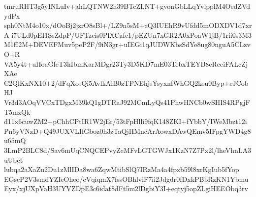 tmruRHT3g5yINLuIv+ahLQTNW2h39BTcZLNT+gvonGbLLqYvlpplM4OedZVdydPx
sph0NtM4o10x/dOoBj2jzrO8sBl+/LZ9n5sM+eQ3IUEhR9vUfdd5mODXDV1d7xrA
i7ULd0pEI1SsZdpP/UFTzcis0PlXCafc1/pEZUn7xGR2A0xPoaW1jB/1rii0s3M3
M1fI2M+DEVEFMuv5peP2F/9iN3gr+uIEGi1qJUDWKbsSdYe8ug80nguA5CLzvO+R
VA5y4t+uHoaGfeT3hIbmKarMDgr23Ty3D5KD7mE03TebxTEYB8cReeiFALcZjXAe
C2QlKxNX10+2/dFqXosQi5AvlkAlB0zTPNEhjsYsyxnfWhGQ2keu0Byp+cJCobHJ
Vr3d3AOqVVCxTDgxM39kQ1gDTRaJ92MCmLyQs41PhwHNCb0wSHIS4RPgjFT5mzQk
d11x6cuwZM2+pChhCPtIR1W2jEr/53tFpHlli9fqK148ZKI+fYbbY/IWeMbzt12i
Pn6yVNzD+Q49JUXVLIfGboz0h3zTaQjHMncArAowxDAwQEmv5IFpgYWD4g8u65mQ
3LmP2BLC8d/Sav6mUqCNQCEPvyZeMFvLGTGWJx1KzN7Z7Px2l/lheVhnLA3uUbet
lubqa2aXaZu2Du1zMlIDa8wa6ZqwMtibSlQ7IRzMa4a4fpxb59l8xrKgIub5fYop
EGscP2V3smdYZIeOheo/cVqiqmX7fssOBhlviF7ii2Jdgdr0fDxkPBbRzKN1Ybmu
Eyx/xjUXpVaH3UYVZDpE3c6idat8dFt5m2lDgbiY3I+eqtyj5opZLgiHEEObq3rv

